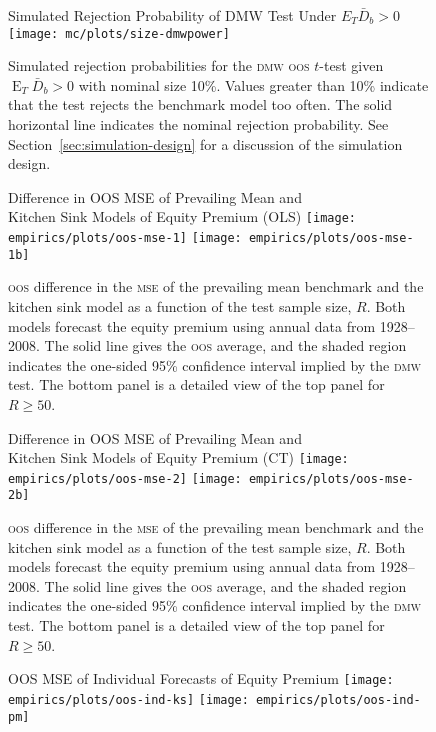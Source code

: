 \documentclass[11pt]{article}
\DeclareMathOperator{\E}{E}
\newcommand{\oosB}{\bar{D}_b}
\begin{document}
\begin{figure}
  \centering
  \large{Simulated Rejection Probability of DMW Test Under $E_T
      \oosB > 0$}
  \texttt{[image: mc/plots/size-dmwpower]}
  \caption{Simulated rejection probabilities for the \protect \textsc{dmw}
    \protect\textsc{oos} $t$-test given $\E_T \oosB > 0$ with nominal
    size 10\%.  Values greater than 10\% indicate that the test
    rejects the benchmark model too often.  The solid horizontal line
    indicates the nominal rejection probability.  See
    Section~\ref{sec:simulation-design} for a discussion of the
    simulation design.}
  \label{fig:ttest-power}
\end{figure}

\begin{figure}
\centering
\large{Difference in OOS MSE of Prevailing Mean and\\ Kitchen
    Sink Models of Equity Premium (OLS)}
\texttt{[image: empirics/plots/oos-mse-1]}
\texttt{[image: empirics/plots/oos-mse-1b]}
\caption{\protect \textsc{oos} difference in the \protect\textsc{mse}
  of the prevailing mean benchmark and the kitchen sink model as a
  function of the test sample size, $R$.  Both models forecast the
  equity premium using annual data from 1928--2008.  The solid line
  gives the \protect \textsc{oos} average, and the shaded region indicates the
  one-sided 95\% confidence interval implied by the \protect
  \textsc{dmw} test.  The bottom panel is a detailed view of the top
  panel for $R \geq 50$.}
\label{fig:empirics1}
\end{figure}

\begin{figure}
\centering
\large{Difference in OOS MSE of Prevailing Mean and\\ Kitchen
    Sink Models of Equity Premium (CT)}
\texttt{[image: empirics/plots/oos-mse-2]}
\texttt{[image: empirics/plots/oos-mse-2b]}
\caption{\protect \textsc{oos} difference in the \protect\textsc{mse}
  of the prevailing mean benchmark and the kitchen sink model as a
  function of the test sample size, $R$.  Both models forecast the
  equity premium using annual data from 1928--2008.  The solid line
  gives the \protect \textsc{oos} average, and the shaded region indicates the
  one-sided 95\% confidence interval implied by the \protect
  \textsc{dmw} test.  The bottom panel is a detailed view of the top
  panel for $R \geq 50$.}
\label{fig:empirics2}
\end{figure}

\begin{figure}
\centering
\large{OOS MSE of Individual Forecasts of Equity Premium}
\texttt{[image: empirics/plots/oos-ind-ks]}
\texttt{[image: empirics/plots/oos-ind-pm]}
\caption{}
\label{fig:empirics3}
\end{figure}
\end{document}
